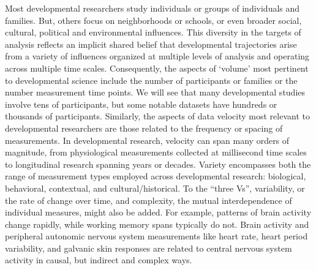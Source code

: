 \documentclass[letterpaper,man,apacite]{apa6}
\begin{document}
Most developmental researchers study individuals or groups of individuals and families.
But, others focus on neighborhoods or schools, or even broader social, cultural, political and environmental influences.
This diversity in the targets of analysis reflects an implicit shared belief that developmental trajectories arise from a variety of influences organized at multiple levels of analysis and operating across multiple time scales.
Consequently, the aspects of `volume' most pertinent to developmental science include the number of participants or families or the number measurement time points.
We will see that many developmental studies involve tens of participants, but some notable datasets have hundreds or thousands of participants.
Similarly, the aspects of data velocity most relevant to developmental researchers are those related to the frequency or spacing of measurements.
In developmental research, velocity can span many orders of magnitude, from physiological measurements collected at millisecond time scales to longitudinal research spanning years or decades.
Variety encompasses both the range of measurement types employed across developmental research: biological, behavioral, contextual, and cultural/historical.
To the ``three Vs'', variability, or the rate of change over time, and complexity, the mutual interdependence of individual measures, might also be added.
For example, patterns of brain activity change rapidly, while working memory spans typically do not.
Brain activity and peripheral autonomic nervous system measurements like heart rate, heart period variability, and galvanic skin responses are related to central nervous system activity in causal, but indirect and complex ways. 
\end{document}
